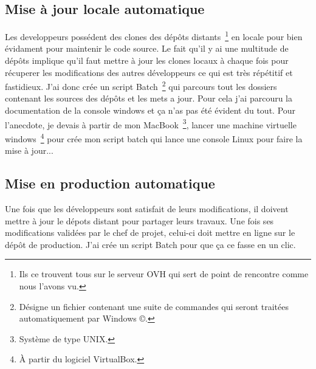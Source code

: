 \subsection{Mise à jour locale automatique} %

Les developpeurs possédent des clones des dépôts distants\, \footnote{Ils ce
trouvent tous sur le serveur OVH qui sert de point de rencontre comme nous
l'avons vu.} en locale pour bien évidament pour maintenir le code source. Le
fait qu'il y ai une multitude de dépôts implique qu'il faut mettre à jour les
clones locaux à chaque fois pour récuperer les modifications des autres
développeurs ce qui est très répétitif et fastidieux. J'ai donc crée un script
Batch\, \footnote{Désigne un fichier contenant une suite de commandes qui
seront traitées automatiquement par Windows \copyright.} qui parcours tout les
dossiers contenant les sources des dépôts et les mets a jour. Pour cela j'ai
parcouru la documentation de la console windows et ça n'as pas été évident du
tout. Pour l'anecdote, je devais à partir de mon MacBook\, \footnote{Système de
type UNIX.}, lancer une machine virtuelle windows\, \footnote{À partir du
logiciel VirtualBox.} pour crée mon script batch qui lance une console Linux
pour faire la mise à jour...


\subsection{Mise en production automatique} %

Une fois que les développeurs sont satisfait de leurs modifications, il doivent
mettre à jour le dépots distant pour partager leurs travaux. Une fois ses
modifications validées par le chef de projet, celui-ci doit mettre en ligne sur
le dépôt de production. J'ai crée un script Batch pour que ça ce fasse en un
clic.

\clearpage
